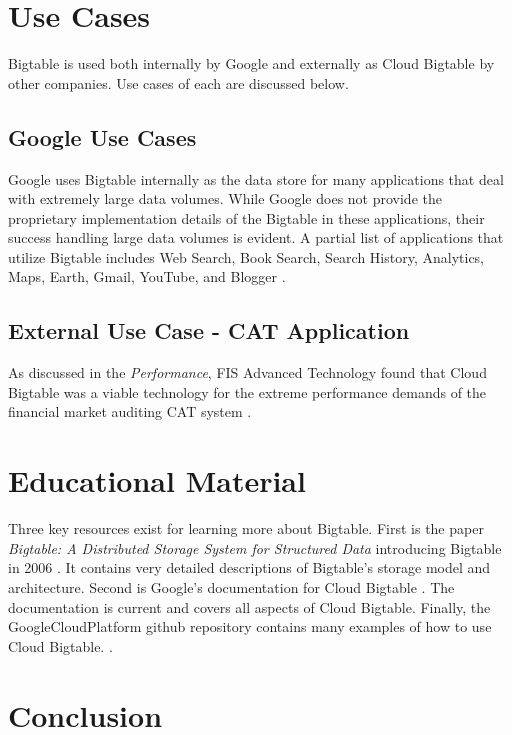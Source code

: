 \documentclass[9pt,twocolumn,twoside]{../../styles/osajnl}
\begin{document}
\section{Use Cases}

Bigtable is used both internally by Google and externally as Cloud Bigtable by other companies.  Use cases of each are discussed below.

\subsection{Google Use Cases}

Google uses Bigtable internally as the data store for many applications that deal with extremely large data volumes. While Google does not provide the proprietary implementation details of the Bigtable in these applications, their success handling large data volumes is evident.  A partial list of applications that utilize Bigtable includes Web Search, Book Search, Search History, Analytics, Maps, Earth, Gmail, YouTube, and Blogger \cite{www-wikibigtable}.


\subsection{External Use Case - CAT Application}

As discussed in the \emph{Performance}, FIS Advanced Technology found that Cloud Bigtable was a viable technology for the extreme performance demands of the financial market auditing CAT system \cite{www-fis}.

\section{Educational Material}

Three key resources exist for learning more about Bigtable. First is the paper \emph{Bigtable: A Distributed Storage System for Structured Data} introducing Bigtable in 2006 \cite{introbigtable}.  It contains very detailed descriptions of Bigtable's storage model and architecture. Second is Google's documentation for Cloud Bigtable \cite{www-bigtabledocumentation}.  The documentation is current and covers all aspects of Cloud Bigtable. Finally, the GoogleCloudPlatform github repository contains many examples of how to use Cloud Bigtable. \cite{git-googlecloud}.

\section{Conclusion}
\end{document}
